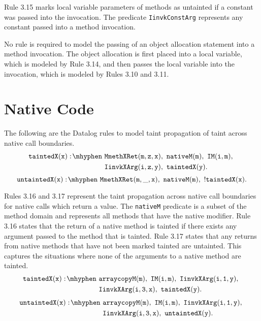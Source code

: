 Rule 3.15 marks local variable parameters of methods as untainted if a
constant was passed into the invocation. The predicate
\texttt{IinvkConstArg} represents any constant passed into a method
invocation.

No rule is required to model the passing of an object allocation
statement into a method invocation. The object allocation is first
placed into a local variable, which is modeled by Rule 3.14, and then
passes the local variable into the invocation, which is modeled by
Rules 3.10 and 3.11.
\section{Native Code}
The following are the Datalog rules to model taint propagation of
taint across native call boundaries.
\begin{equation}
  \begin{split}
    \mathtt{taintedX(x) \is} & \mathtt{MmethXRet(m,z,x) \also
      nativeM(m) \also IM(i,m) \also} \\ & \mathtt{IinvkXArg(i,z,y)
      \also taintedX(y).} \\
  \end{split}
\end{equation}
\begin{equation}
  \mathtt{untaintedX(x) \is MmethXRet(m,\_,x) \also nativeM(m) \also
    !taintedX(x).}
\end{equation}

Rules 3.16 and 3.17 represent the taint propagation across native call
boundaries for native calls which return a value. The \texttt{nativeM}
predicate is a subset of the method domain and represents all methods
that have the native modifier. Rule 3.16 states that the return of a
native method is tainted if there exists any argument passed to the
method that is tainted. Rule 3.17 states that any returns from native
methods that have not been marked tainted are untainted. This captures
the situations where none of the arguments to a native method are
tainted.
\begin{equation}
  \begin{split}
    \mathtt{taintedX(x) \is} & \mathtt{arraycopyM(m) \also IM(i,m)
      \also IinvkXArg(i,1,y) \also} \\ & \mathtt{IinvkXArg(i,3,x)
      \also taintedX(y).} \\
  \end{split}
\end{equation}
\begin{equation}
  \begin{split}
    \mathtt{untaintedX(x) \is} & \mathtt{arraycopyM(m) \also IM(i,m)
      \also IinvkXArg(i,1,y) \also} \\ & \mathtt{IinvkXArg(i,3,x)
      \also untaintedX(y).} \\
  \end{split}
\end{equation}

